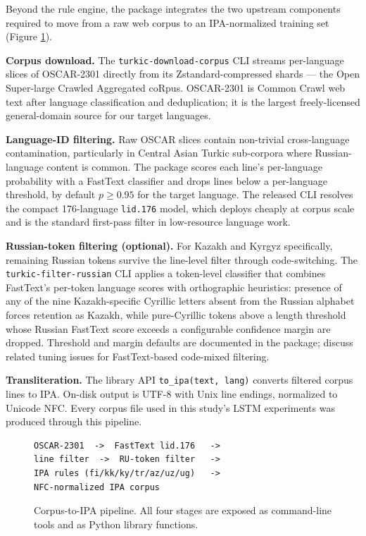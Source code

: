 Beyond the rule engine, the package integrates the two upstream components required to move from a raw web corpus to an IPA-normalized training set (Figure \ref{fig:pipeline}).

\textbf{Corpus download.} The \texttt{turkic-download-corpus} CLI streams per-language slices of OSCAR-2301 directly from its Zstandard-compressed shards \citep{abadji-etal-2022-towards} — the Open Super-large Crawled Aggregated coRpus. OSCAR-2301 is Common Crawl web text after language classification and deduplication; it is the largest freely-licensed general-domain source for our target languages.

\textbf{Language-ID filtering.} Raw OSCAR slices contain non-trivial cross-language contamination, particularly in Central Asian Turkic sub-corpora where Russian-language content is common. The package scores each line's per-language probability with a FastText classifier \citep{joulin2016bag, joulin2017bag} and drops lines below a per-language threshold, by default $p \geq 0.95$ for the target language. The released CLI resolves the compact 176-language \texttt{lid.176} model, which deploys cheaply at corpus scale and is the standard first-pass filter in low-resource language work.%

\textbf{Russian-token filtering (optional).} For Kazakh and Kyrgyz specifically, remaining Russian tokens survive the line-level filter through code-switching. The \texttt{turkic-filter-russian} CLI applies a token-level classifier that combines FastText's per-token language scores with orthographic heuristics: presence of any of the nine Kazakh-specific Cyrillic letters absent from the Russian alphabet forces retention as Kazakh, while pure-Cyrillic tokens above a length threshold whose Russian FastText score exceeds a configurable confidence margin are dropped. Threshold and margin defaults are documented in the package; \citet{raikoti2025fasttext} discuss related tuning issues for FastText-based code-mixed filtering.

\textbf{Transliteration.} The library API \texttt{to\_ipa(text, lang)} converts filtered corpus lines to IPA. On-disk output is UTF-8 with Unix line endings, normalized to Unicode NFC. Every corpus file used in this study's LSTM experiments was produced through this pipeline.

\begin{figure}[t]
\centering
\begin{small}
\begin{verbatim}
OSCAR-2301  ->  FastText lid.176   ->
line filter  ->  RU-token filter   ->
IPA rules (fi/kk/ky/tr/az/uz/ug)   ->
NFC-normalized IPA corpus
\end{verbatim}
\end{small}
\caption{Corpus-to-IPA pipeline. All four stages are exposed as command-line tools and as Python library functions.}
\label{fig:pipeline}
\end{figure}


